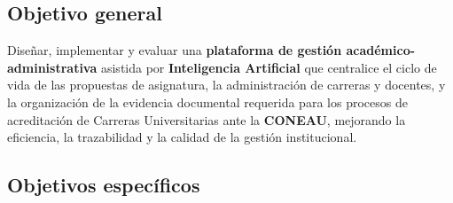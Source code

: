 \subsection{Objetivo general}

Diseñar, implementar y evaluar una \textbf{plataforma de gestión académico-administrativa} asistida por \textbf{Inteligencia Artificial} que centralice el ciclo de vida de las propuestas de asignatura, la administración de carreras y docentes, y la organización de la evidencia documental requerida para los procesos de acreditación de Carreras Universitarias ante la \textbf{CONEAU}, mejorando la eficiencia, la trazabilidad y la calidad de la gestión institucional.

\subsection{Objetivos específicos}

